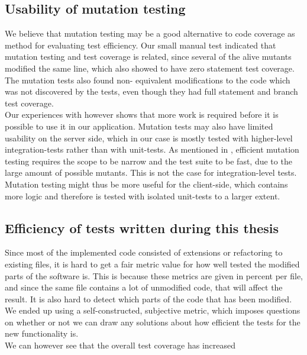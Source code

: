 \subsection{Usability of mutation testing}

We believe that mutation testing may be a good alternative to code
coverage as method for evaluating test efficiency. Our small manual test
indicated that mutation testing and test coverage is related, since
several of the alive mutants modified the same line, which also showed
to have zero statement test coverage. The mutation tests also found non-
equivalent modifications to the code which was not discovered by the
tests, even though they had full statement and branch test coverage.\\

Our experiences with however shows that more work is required before it
is possible to use it in our application. Mutation tests may also have
limited usability on the server side, which in our case is mostly tested
with higher-level integration-tests rather than with unit-tests. As
mentioned in , efficient mutation testing
requires the scope to be narrow and the test suite to be fast, due to
the large amount of possible mutants. This is not the case for
integration-level tests. Mutation testing might thus be more useful for
the client-side, which contains more logic and therefore is tested with
isolated unit-tests to a larger extent.\\


\subsection{Efficiency of tests written during this thesis}

Since most of the implemented code consisted of extensions or
refactoring to existing files, it is hard to get a fair metric value for
how well tested the modified parts of the software is. This is because
these metrics are given in percent per file, and since the same file
contains a lot of unmodified code, that will affect the result. It is
also hard to detect which parts of the code that has been modified. We
ended up using a self-constructed, subjective metric, which imposes
questions on whether or not we can draw any solutions about how
efficient the tests for the new functionality is.\\

We can however see that the overall test coverage has increased

